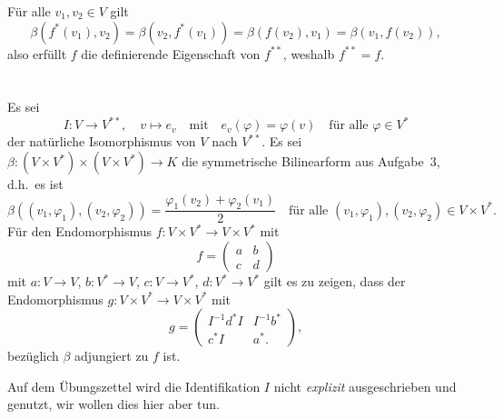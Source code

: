 \documentclass[a4paper,10pt,numbers=noenddot]{scrartcl}
\begin{document}
Für alle $v_1, v_2 \in V$ gilt
\[
    \beta(f^*(v_1), v_2)
  = \beta(v_2, f^*(v_1))
  = \beta(f(v_2), v_1)
  = \beta(v_1, f(v_2)),
\]
also erfüllt $f$ die definierende Eigenschaft von $f^{**}$, weshalb $f^{**} = f$.










\section{}


Es sei
\[
  I \colon V \to V^{**},
  \quad
  v \mapsto e_v
  \quad\text{mit}\quad
  e_v(\varphi) = \varphi(v)
  \quad
  \text{für alle $\varphi \in V^*$}
\]
der natürliche Isomorphismus von $V$ nach $V^{**}$.
Es sei $\beta \colon (V \times V^*) \times (V \times V^*) \to K$ die symmetrische Bilinearform aus Aufgabe~3, d.h.\ es ist
\[
    \beta((v_1, \varphi_1), (v_2, \varphi_2))
  = \frac{ \varphi_1(v_2) + \varphi_2(v_1) }{2}
  \quad
  \text{für alle $(v_1, \varphi_1), (v_2, \varphi_2) \in V \times V^*$}.
\]
Für den Endomorphismus $f \colon V \times V^* \to V \times V^*$ mit
\[
  f
  =
  \begin{pmatrix}
    a & b \\
    c & d
  \end{pmatrix}
\]
mit $a \colon V \to V$, $b \colon V^* \to V$, $c \colon V \to V^*$, $d \colon V^* \to V^*$ gilt es zu zeigen, dass der Endomorphismus $g \colon V \times V^* \to V \times V^*$ mit
\[
  g
  =
  \begin{pmatrix}
    I^{-1} d^* I  & I^{-1} b^*  \\
    c^* I           & a^*.
  \end{pmatrix},
\]
bezüglich $\beta$ adjungiert zu $f$ ist.


\begin{remark}
  Auf dem Übungszettel wird die Identifikation $I$ nicht \emph{explizit} ausgeschrieben und genutzt, wir wollen dies hier aber tun.
\end{remark}
\end{document}
